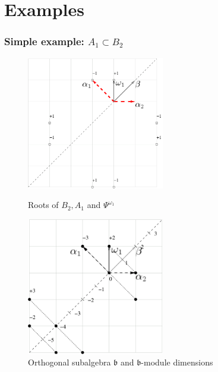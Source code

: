 \documentclass[pdftex]{beamer}
\theoremstyle{definition} \newtheorem{Def}{Definition}
\begin{document}
\section{Examples}
\begin{frame}
  \frametitle{Simple example: $A_{1}\subset B_{2}$}
  \begin{figure}[t]
    \vspace*{-0.5cm}
    \begin{multicols}{2}
      \hfill
      \includegraphics[width=60mm]{figures/figure1}
      \hfill
      \caption{Roots of $B_{2},A_{1}$ and $\Psi ^{\omega_1  }$}
      \hfill
      \vspace{5mm}
      \includegraphics[width=60mm]{figures/figure2}
      \caption{Orthogonal subalgebra $\mathfrak{b}$ and $\mathfrak{b}$-module dimensions}
    \end{multicols}
  \end{figure}
\end{frame}
\end{document}
